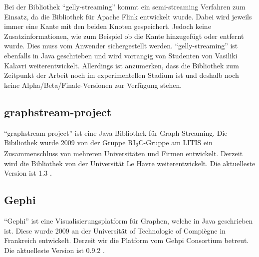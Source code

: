 Bei der Bibliothek \enquote{gelly-streaming} kommt ein semi-streaming Verfahren
zum Einsatz, da die Bibliothek für Apache Flink entwickelt wurde. Dabei wird
jeweils immer eine Kante mit den beiden Knoten gespeichert. Jedoch keine
Zusatzinformationen, wie zum Beispiel ob die Kante hinzugefügt oder entfernt
wurde. Dies muss vom Anwender sichergestellt werden. \enquote{gelly-streaming}
ist ebenfalls in Java geschrieben und wird vorrangig von Studenten von
Vasiliki Kalavri weiterentwickelt. Allerdings ist anzumerken, dass die Bibliothek
zum Zeitpunkt der Arbeit noch im experimentellen Stadium ist und deshalb noch
keine Alpha/Beta/Finale-Versionen zur Verfügung stehen.


\subsection{graphstream-project}
\enquote{graphstream-project} ist eine Java-Bibliothek für Graph-Streaming. Die
Bibiliothek wurde 2009 von der Gruppe RI\textsubscript{2}C-Gruppe am LITIS ein
Zusammenschluss von mehreren Universitäten und Firmen entwickelt. Derzeit wird
die Bibliothek von der Universität Le Havre weiterentwickelt. Die aktuelleste
Version ist 1.3 .



\subsection{Gephi}
\enquote{Gephi} ist eine Visualisierungsplatform für Graphen, welche in Java
geschrieben ist. Diese wurde 2009 an der Universität of Technologie of Compiègne
in Frankreich entwickelt. Derzeit wir die Platform vom Gehpi Consortium betreut.
Die aktuelleste Version ist 0.9.2 .

